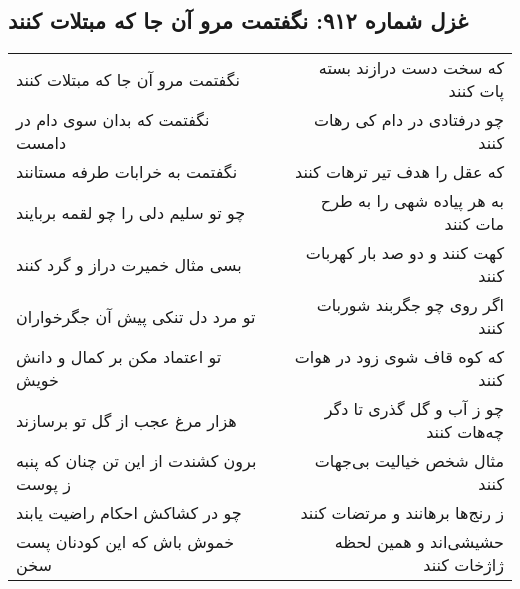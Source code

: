 \begin{center}
\section*{غزل شماره ۹۱۲: نگفتمت مرو آن جا که مبتلات کنند}
\label{sec:0912}
\begin{longtable}{l p{0.5cm} r}
نگفتمت مرو آن جا که مبتلات کنند
&&
که سخت دست درازند بسته پات کنند
\\
نگفتمت که بدان سوی دام در دامست
&&
چو درفتادی در دام کی رهات کنند
\\
نگفتمت به خرابات طرفه مستانند
&&
که عقل را هدف تیر ترهات کنند
\\
چو تو سلیم دلی را چو لقمه بربایند
&&
به هر پیاده شهی را به طرح مات کنند
\\
بسی مثال خمیرت دراز و گرد کنند
&&
کهت کنند و دو صد بار کهربات کنند
\\
تو مرد دل تنکی پیش آن جگرخواران
&&
اگر روی چو جگربند شوربات کنند
\\
تو اعتماد مکن بر کمال و دانش خویش
&&
که کوه قاف شوی زود در هوات کنند
\\
هزار مرغ عجب از گل تو برسازند
&&
چو ز آب و گل گذری تا دگر چه‌هات کنند
\\
برون کشندت از این تن چنان که پنبه ز پوست
&&
مثال شخص خیالیت بی‌جهات کنند
\\
چو در کشاکش احکام راضیت یابند
&&
ز رنج‌ها برهانند و مرتضات کنند
\\
خموش باش که این کودنان پست سخن
&&
حشیشی‌اند و همین لحظه ژاژخات کنند
\\
\end{longtable}
\end{center}
